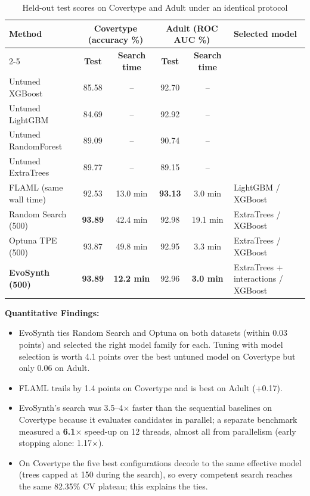 \documentclass[11pt, a4paper]{article}
\begin{document}
\begin{table}[H]
    \centering
    \footnotesize
    \renewcommand{\arraystretch}{1.25}
    \begin{tabular}{|p{3.6cm}|c|c|c|c|p{3.2cm}|}
        \hline
        \multirow{2}{*}{\textbf{Method}} & \multicolumn{2}{c|}{\textbf{Covertype (accuracy \%)}} & \multicolumn{2}{c|}{\textbf{Adult (ROC AUC \%)}} & \multirow{2}{*}{\textbf{Selected model}} \\
        \cline{2-5}
         & \textbf{Test} & \textbf{Search time} & \textbf{Test} & \textbf{Search time} & \\
        \hline
        Untuned XGBoost & 85.58 & -- & 92.70 & -- & \\
        \hline
        Untuned LightGBM & 84.69 & -- & 92.92 & -- & \\
        \hline
        Untuned RandomForest & 89.09 & -- & 90.74 & -- & \\
        \hline
        Untuned ExtraTrees & 89.77 & -- & 89.15 & -- & \\
        \hline
        FLAML (same wall time) & 92.53 & 13.0 min & \textbf{93.13} & 3.0 min & LightGBM / XGBoost \\
        \hline
        Random Search (500) & \textbf{93.89} & 42.4 min & 92.98 & 19.1 min & ExtraTrees / XGBoost \\
        \hline
        Optuna TPE (500) & 93.87 & 49.8 min & 92.95 & 3.3 min & ExtraTrees / XGBoost \\
        \hline
        \textbf{EvoSynth (500)} & \textbf{93.89} & \textbf{12.2 min} & 92.96 & \textbf{3.0 min} & ExtraTrees + interactions / XGBoost \\
        \hline
    \end{tabular}
    \caption{Held-out test scores on Covertype and Adult under an identical protocol}
\end{table}

\noindent
\textbf{Quantitative Findings:}
\begin{itemize}[noitemsep, topsep=2pt]
    \item EvoSynth ties Random Search and Optuna on both datasets (within 0.03 points) and selected the right model family for each. Tuning with model selection is worth 4.1 points over the best untuned model on Covertype but only 0.06 on Adult.
    \item FLAML trails by 1.4 points on Covertype and is best on Adult (+0.17).
    \item EvoSynth's search was 3.5--4$\times$ faster than the sequential baselines on Covertype because it evaluates candidates in parallel; a separate benchmark measured a \textbf{6.1$\times$} speed-up on 12 threads, almost all from parallelism (early stopping alone: 1.17$\times$).
    \item On Covertype the five best configurations decode to the same effective model (trees capped at 150 during the search), so every competent search reaches the same 82.35\% CV plateau; this explains the ties.
\end{itemize}
\end{document}
